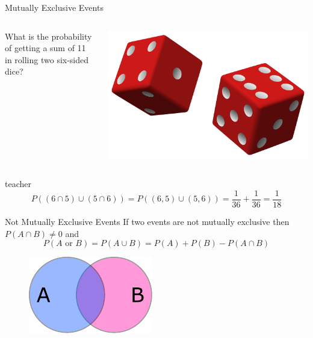 \begin{frame}{Mutually Exclusive Events}
    \pause
    \begin{example}
        \medskip
        \begin{columns}
            \begin{column}{0.65\textwidth}
                What is the probability of getting a sum of 11 in rolling two six-sided dice?
            \end{column}
            \begin{column}{0.25\textwidth}
                \includegraphics[width=\textwidth]{gfx/web/dice}
            \end{column}
        \end{columns}
    \end{example}
    \medskip
    \begin{shownto}{teacher}
        \pause
        \begin{equation*}
        P((6 \cap 5) \cup (5 \cap 6)) = P((6, 5) \cup (5, 6)) = \frac{1}{36} + \frac{1}{36} = \frac{1}{18}
        \end{equation*}
    \end{shownto}


\end{frame}


\begin{frame}{Not Mutually Exclusive Events}
    If two events are not mutually exclusive then $P(A \cap B) \neq 0$ and
    \begin{equation}
    P(A\text{ or }B) = P(A \cup B) = P(A) + P(B) - P(A \cap B)
    \end{equation}
    
    \begin{figure}
        \includegraphics[width=0.4\linewidth]{gfx/sets_AB}
    \end{figure}
\end{frame}

